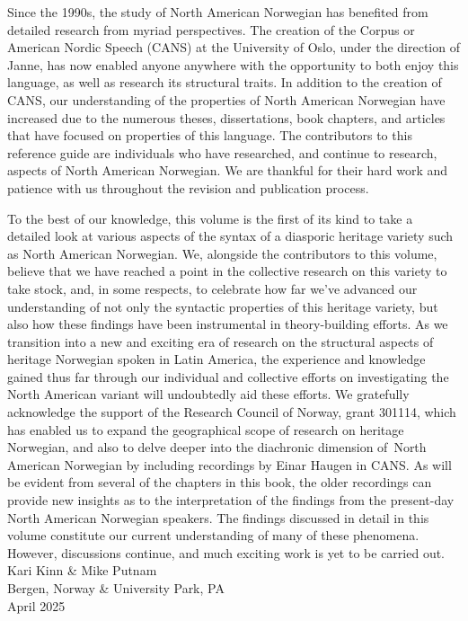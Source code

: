 \begin{refsection}
Since the 1990s, the study of North American Norwegian has benefited from detailed research from myriad perspectives. The creation of the Corpus or American Nordic Speech (CANS) at the University of Oslo, under the direction of Janne, has now enabled anyone anywhere with the opportunity to both enjoy this language, as well as research its structural traits. In addition to the creation of CANS, our understanding of the properties of North American Norwegian have increased due to the numerous theses, dissertations, book chapters, and articles that have focused on properties of this language. The contributors to this reference guide are individuals who have researched, and continue to research, aspects of North American Norwegian. We are thankful for their hard work and patience with us throughout the revision and publication process. 

To the best of our knowledge, this volume is the first of its kind to take a detailed look at various aspects of the syntax of a diasporic heritage variety such as North American Norwegian. We, alongside the contributors to this volume, believe that we have reached a point in the collective research on this variety to take stock, and, in some respects, to celebrate how far we’ve advanced our understanding of not only the syntactic properties of this heritage variety, but also how these findings have been instrumental in theory-building efforts. As we transition into a new and exciting era of research on the structural aspects of heritage Norwegian spoken in Latin America, the experience and knowledge gained thus far through our individual and collective efforts on investigating the North American variant will undoubtedly aid these efforts. We gratefully acknowledge the support of the Research Council of Norway, grant 301114, which has enabled us to expand the geographical scope of  research on heritage Norwegian, and also to delve deeper into the diachronic dimension of North American Norwegian by including recordings by Einar Haugen in CANS. As will be evident from several of the chapters in this book, the older recordings can provide new insights as to the interpretation of the findings from the present-day North American Norwegian speakers. The findings discussed in detail in this volume constitute our current understanding of many of these phenomena. However, discussions continue, and much exciting work is yet to be carried out.\bigskip\\
\noindent Kari Kinn \& Mike Putnam\\
Bergen, Norway \& University Park, PA\\
April 2025 

{\sloppy\printbibliography[heading=subbibliography]}
\end{refsection}
